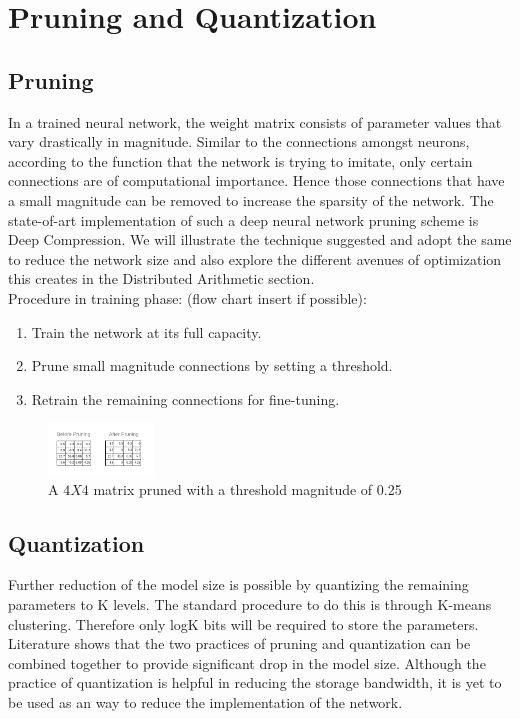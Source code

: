 \section{Pruning and Quantization}
\subsection{Pruning}
In a trained neural network, the weight matrix consists of parameter values that vary drastically in magnitude. Similar to the connections amongst neurons, according to the function that the network is trying to imitate, only certain connections are of computational importance. Hence those connections that have a small magnitude can be removed to increase the sparsity of the network. The state-of-art implementation of such a deep neural network pruning scheme is Deep Compression. We will illustrate the technique suggested and adopt the same to reduce the network size and also explore the different avenues of optimization this creates in the Distributed Arithmetic section.\\
Procedure in training phase: (flow chart insert if possible):
\begin{enumerate}
    \item Train the network at its full capacity.
    \item Prune small magnitude connections by setting a threshold.
    \item Retrain the remaining connections for fine-tuning.
\end{enumerate}

\begin{figure}[h] 
	\caption{A $4X4$ matrix pruned with a threshold magnitude of 0.25}    
    \centering
    \includegraphics[width=0.25\textwidth]{pruning}
\end{figure}

\subsection{Quantization}
Further reduction of the model size is possible by quantizing the remaining parameters to K levels. The standard procedure to do this is through K-means clustering. Therefore only logK bits will be required to store the parameters. Literature shows that the two practices of pruning and quantization can be combined together to provide significant drop in the model size. Although the practice of quantization is helpful in reducing the storage bandwidth, it is yet to be used as an way to reduce the implementation of the network. 




